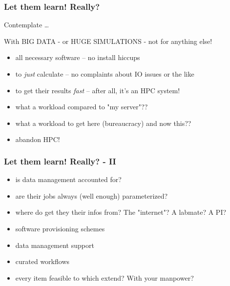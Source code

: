 \begin{frame}
  \frametitle{Let them learn! Really?}
  \bcinfo Contemplate \ldots
  \pause
  \begin{question}
  	\pause With BIG DATA - or HUGE SIMULATIONS - not for anything else!
  \end{question}
  \pause
  \begin{question}
  	\begin{itemize}[<+->]
  		\item all necessary software -- no install hiccups
  		\item to \emph{just} calculate -- no complaints about IO issues or the like
  		\item to get their results \emph{fast} -- after all, it's an HPC system!
  	\end{itemize}
  \end{question}
  \pause
  \begin{question}
  	\begin{itemize}[<+->]
  		\item what a workload compared to "my server"??
  		\item what a workload to get here (bureaucracy) and now this??
  		\item abandon HPC!
  	\end{itemize}
  \end{question}	
\end{frame}	

\begin{frame}
  \frametitle{Let them learn! Really? - II}
  \begin{question}
	\begin{itemize}[<+->]
		\item is data management accounted for?
		\item are their jobs always (well enough) parameterized?
		\item where do get they their infos from? The "internet"? A labmate? A PI?
	\end{itemize}	
  \end{question}
  \pause
  \begin{question}
    \begin{itemize}[<+->]
      \item software provisioning schemes
      \item data management support
      \item curated workflows
      \item every item feasible to which extend? With your manpower?
    \end{itemize}
  \end{question}
\end{frame}	



